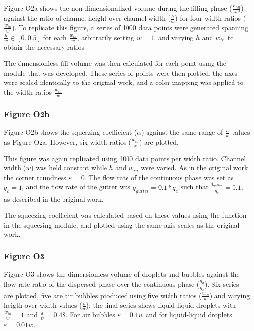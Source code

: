 Figure O2a shows the non-dimensionalized volume during the filling phase ($\frac{V_{fill}}{hw^2}$)
against the ratio of channel height over channel width ($\frac{h}{w}$) for four width ratios 
($\frac{w_{in}}{w}$).
To replicate this figure, a series of 1000 data points were generated spanning $\frac{h}{w} \in [0,0.5]$
for each $\frac{w_{in}}{w}$, arbitrarily setting $w=1$, and varying $h$ and
$w_{in}$ to obtain the necessary ratios.

The dimensionless fill volume was then calculated for each point using the module that was
developed. These series of points were then plotted, the axes were scaled identically to the
original work, and a color mapping was applied to the width ratios $\frac{w_{in}}{w}$.

\subsubsection{Figure O2b}

Figure O2b shows the squeezing coefficient ($\alpha$) against the same range of $\frac{h}{w}$
values as Figure O2a. However, six width ratios ($\frac{w_{in}}{w}$) are plotted.

This figure was again replicated using 1000 data points per width ratio. Channel width ($w$) was
held constant while $h$ and $w_{in}$ were varied. As in the original work the corner roundness
$\varepsilon=0$. The flow rate of the continuous phase was set as $q_c=1$, and the flow rate of the
gutter was $q_{gutter}=0.1*q_c$ such that $\frac{q_{gutter}}{q_c}=0.1$, as described in the original
work.

The squeezing coefficient was calculated based on these values using the function in the
squeezing module, and plotted using the same axis scales as the original work.

\subsubsection{Figure O3}

Figure O3 shows the dimensionless volume of droplets and bubbles against the flow rate ratio
of the dispersed phase over the continuous phase ($\frac{q_d}{q_c}$). Six series are plotted,
five are air bubbles produced using five width ratios ($\frac{w_{in}}{w}$) and varying heigth over width
values ($\frac{h}{w}$); the final series shows liquid-liquid droplets with $\frac{w_{in}}{w} = 1$ and
$\frac{h}{w}=0.48$. For air bubbles $\varepsilon=0.1w$ and for liquid-liquid droplets $\varepsilon=0.01w$.

